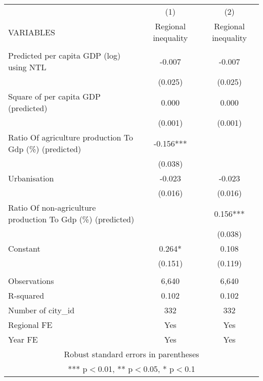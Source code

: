 \documentclass[]{article}
\begin{document}
\begin{tabular}{lcc} \hline
 & (1) & (2) \\
VARIABLES & Regional inequality & Regional inequality \\ \hline
 &  &  \\
Predicted per capita GDP (log) using NTL & -0.007 & -0.007 \\
 & (0.025) & (0.025) \\
Square of per capita GDP (predicted) & 0.000 & 0.000 \\
 & (0.001) & (0.001) \\
Ratio Of agriculture production To Gdp (\%) (predicted) & -0.156*** &  \\
 & (0.038) &  \\
Urbanisation & -0.023 & -0.023 \\
 & (0.016) & (0.016) \\
Ratio Of non-agriculture production To Gdp (\%) (predicted) &  & 0.156*** \\
 &  & (0.038) \\
Constant & 0.264* & 0.108 \\
 & (0.151) & (0.119) \\
 &  &  \\
Observations & 6,640 & 6,640 \\
R-squared & 0.102 & 0.102 \\
Number of city\_id & 332 & 332 \\
Regional FE & Yes & Yes \\
 Year FE & Yes & Yes \\ \hline
\multicolumn{3}{c}{ Robust standard errors in parentheses} \\
\multicolumn{3}{c}{ *** p$<$0.01, ** p$<$0.05, * p$<$0.1} \\
\end{tabular}
\end{document}
